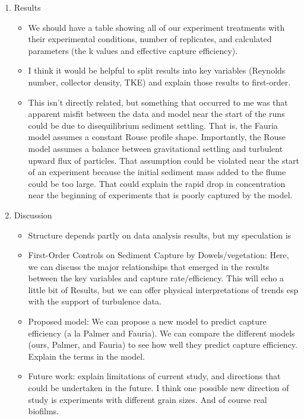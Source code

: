 \documentclass{scrreprt}
\begin{document}
\begin{enumerate}
    \item Results
    \begin{itemize}
        \item We should have a table showing all of our experiment treatments with their experimental conditions, number of replicates, and calculated parameters (the k values and effective capture efficiency).
        \item I think it would be helpful to split results into key variables (Reynolds number, collector density, TKE) and explain those results to first-order.
        \item This isn't directly related, but something that occurred to me was that apparent misfit between the data and model near the start of the runs could be due to disequilibrium sediment settling. That is, the Fauria model assumes a constant Rouse profile shape. Importantly, the Rouse model assumes a balance between gravitational settling and turbulent upward flux of particles. That assumption could be violated near the start of an experiment because the initial sediment mass added to the flume could be too large. That could explain the rapid drop in concentration near the beginning of experiments that is poorly captured by the model.
    \end{itemize}
    
    \item Discussion
    \begin{itemize}
        \item Structure depends partly on data analysis results, but my speculation is
        \item First-Order Controls on Sediment Capture by Dowels/vegetation: Here, we can discuss the major relationships that emerged in the results between the key variables and capture rate/efficiency. This will echo a little bit of Results, but we can offer physical interpretations of trends esp with the support of turbulence data.
        \item Proposed model: We can propose a new model to predict capture efficiency (a la Palmer and Fauria). We can compare the different models (ours, Palmer, and Fauria) to see how well they predict capture efficiency. Explain the terms in the model.
        \item Future work: explain limitations of current study, and directions that could be undertaken in the future. I think one possible new direction of study is experiments with different grain sizes. And of course real biofilms.
    \end{itemize}
    

\end{enumerate}
\end{document}
